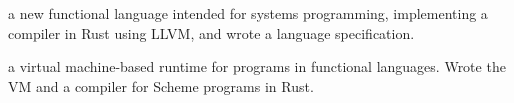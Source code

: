 \documentclass[a4paper]{tufte-handout}
\begin{document}
%
%

 a new functional language intended for systems programming, implementing a compiler in Rust using LLVM, and wrote a language specification.

 a virtual machine-based runtime for programs in functional languages. Wrote the VM and a compiler for Scheme programs in Rust.
\end{document}
